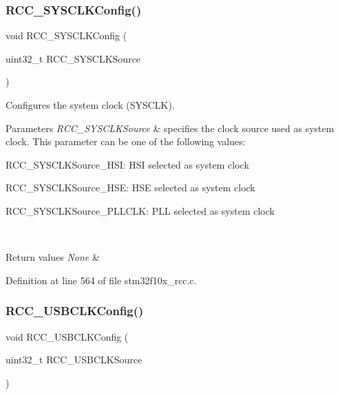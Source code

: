 \subsubsection{\texorpdfstring{R\+C\+C\+\_\+\+S\+Y\+S\+C\+L\+K\+Config()}{RCC\_SYSCLKConfig()}}
{\footnotesize\ttfamily void R\+C\+C\+\_\+\+S\+Y\+S\+C\+L\+K\+Config (\begin{DoxyParamCaption}\item[{uint32\+\_\+t}]{R\+C\+C\+\_\+\+S\+Y\+S\+C\+L\+K\+Source }\end{DoxyParamCaption})}



Configures the system clock (S\+Y\+S\+C\+LK). 


\begin{DoxyParams}{Parameters}
{\em R\+C\+C\+\_\+\+S\+Y\+S\+C\+L\+K\+Source} & specifies the clock source used as system clock. This parameter can be one of the following values\+: \begin{DoxyItemize}
\item R\+C\+C\+\_\+\+S\+Y\+S\+C\+L\+K\+Source\+\_\+\+H\+SI\+: H\+SI selected as system clock \item R\+C\+C\+\_\+\+S\+Y\+S\+C\+L\+K\+Source\+\_\+\+H\+SE\+: H\+SE selected as system clock \item R\+C\+C\+\_\+\+S\+Y\+S\+C\+L\+K\+Source\+\_\+\+P\+L\+L\+C\+LK\+: P\+LL selected as system clock \end{DoxyItemize}
\\
\hline
\end{DoxyParams}

\begin{DoxyRetVals}{Return values}
{\em None} & \\
\hline
\end{DoxyRetVals}


Definition at line 564 of file stm32f10x\+\_\+rcc.\+c.

\mbox{\label{group___r_c_c___exported___functions_ga895b3ff3d143c990f1cd0146aa260081}} 
\subsubsection{\texorpdfstring{R\+C\+C\+\_\+\+U\+S\+B\+C\+L\+K\+Config()}{RCC\_USBCLKConfig()}}
{\footnotesize\ttfamily void R\+C\+C\+\_\+\+U\+S\+B\+C\+L\+K\+Config (\begin{DoxyParamCaption}\item[{uint32\+\_\+t}]{R\+C\+C\+\_\+\+U\+S\+B\+C\+L\+K\+Source }\end{DoxyParamCaption})}



